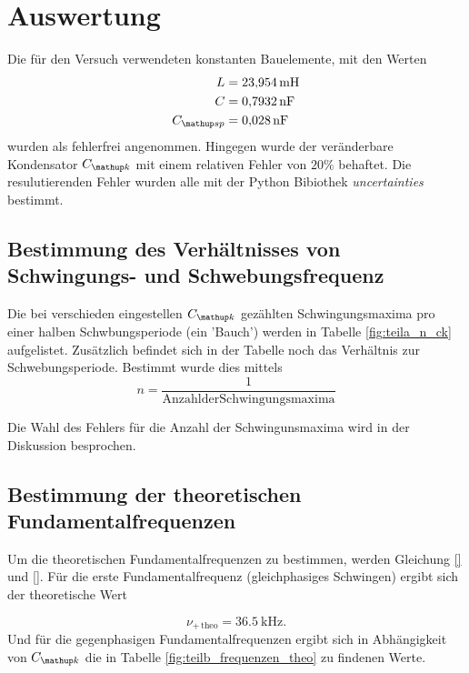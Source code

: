 \section{Auswertung}
Die für den Versuch verwendeten konstanten Bauelemente, mit den Werten
\begin{align*}
L&=\SI{23.954}{\milli\henry}\\
C&=\SI{0.7932}{\nano\farad}\\
C\ua{sp}&=\SI{0.028}{\nano\farad}
\end{align*}
wurden als fehlerfrei angenommen.
Hingegen wurde der veränderbare Kondensator $C\ua{k}$ mit
einem relativen Fehler von $20\%$ behaftet.
Die resulutierenden Fehler wurden alle mit der Python Bibiothek 
\emph{uncertainties} bestimmt.

\subsection{Bestimmung des Verhältnisses von Schwingungs- und Schwebungsfrequenz}
Die bei verschieden eingestellen $C\ua{k}$ gezählten Schwingungsmaxima pro einer halben
Schwbungsperiode (ein 'Bauch') werden in Tabelle \ref{fig:teila_n_ck} aufgelistet.
Zusätzlich befindet sich in der Tabelle noch das Verhältnis zur Schwebungsperiode.
Bestimmt wurde dies mittels
\begin{equation*}
n=\frac{1}{\mathup{Anzahl der Schwingungsmaxima}}
\end{equation*}

Die Wahl des Fehlers für die Anzahl der Schwingunsmaxima wird in der Diskussion besprochen.


\subsection{Bestimmung der theoretischen Fundamentalfrequenzen}
Um die theoretischen Fundamentalfrequenzen zu bestimmen, werden Gleichung \eqref{} und 
\eqref{}.
Für die erste Fundamentalfrequenz (gleichphasiges Schwingen) ergibt sich der 
theoretische Wert

\begin{equation}
\label{eq:nu_plu_theo}
\nu_{+\,\mathup{theo}}=\SI{36,5}{\kilo\hertz}.
\end{equation}
Und für die gegenphasigen Fundamentalfrequenzen ergibt sich in Abhängigkeit von $C\ua{k}$ die in Tabelle \ref{fig:teilb_frequenzen_theo} zu findenen Werte. 


